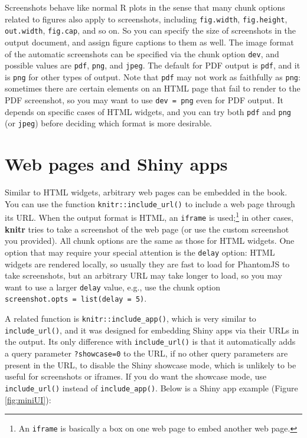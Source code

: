 \documentclass[
  12pt,
]{krantz}
\theoremstyle{definition}
\theoremstyle{definition}
\theoremstyle{definition}
\theoremstyle{definition}
\theoremstyle{remark}
\begin{document}
Screenshots behave like normal R plots in the sense that many chunk options related to figures also apply to screenshots, including \texttt{fig.width}, \texttt{fig.height}, \texttt{out.width}, \texttt{fig.cap}, and so on. So you can specify the size of screenshots in the output document, and assign figure captions to them as well. The image format of the automatic screenshots can be specified via the chunk option \texttt{dev}, and possible values are \texttt{pdf}, \texttt{png}, and \texttt{jpeg}. The default for PDF output is \texttt{pdf}, and it is \texttt{png} for other types of output. Note that \texttt{pdf} may not work as faithfully as \texttt{png}: sometimes there are certain elements on an HTML page that fail to render to the PDF screenshot, so you may want to use \texttt{dev\ =\ \textquotesingle{}png\textquotesingle{}} even for PDF output. It depends on specific cases of HTML widgets, and you can try both \texttt{pdf} and \texttt{png} (or \texttt{jpeg}) before deciding which format is more desirable.

\hypertarget{web-pages-and-shiny-apps}{%
\section{Web pages and Shiny apps}\label{web-pages-and-shiny-apps}}

Similar to HTML widgets, arbitrary web pages can be embedded in the book. You can use the function \texttt{knitr::include\_url()} to include a web page through its URL. When the output format is HTML, an \texttt{iframe} is used;\footnote{An \texttt{iframe} is basically a box on one web page to embed another web page.} in other cases, \textbf{knitr} tries to take a screenshot of the web page (or use the custom screenshot you provided). All chunk options are the same as those for HTML widgets. One option that may require your special attention is the \texttt{delay} option: HTML widgets are rendered locally, so usually they are fast to load for PhantomJS to take screenshots, but an arbitrary URL may take longer to load, so you may want to use a larger \texttt{delay} value, e.g., use the chunk option \texttt{screenshot.opts\ =\ list(delay\ =\ 5)}.

A related function is \texttt{knitr::include\_app()}, which is very similar to \texttt{include\_url()}, and it was designed for embedding Shiny apps via their URLs in the output. Its only difference with \texttt{include\_url()} is that it automatically adds a query parameter \texttt{?showcase=0} to the URL, if no other query parameters are present in the URL, to disable the Shiny showcase mode, which is unlikely to be useful for screenshots or iframes. If you do want the showcase mode, use \texttt{include\_url()} instead of \texttt{include\_app()}. Below is a Shiny app example (Figure \ref{fig:miniUI}):
\end{document}
